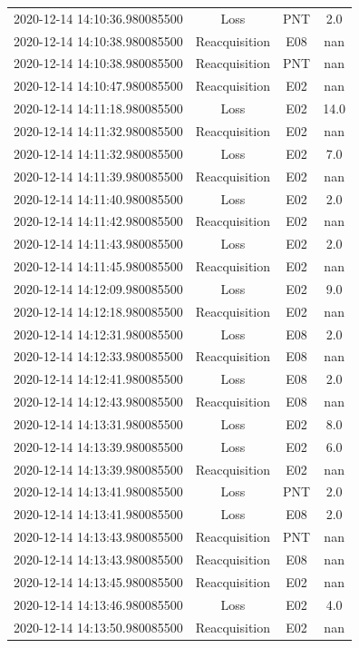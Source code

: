 \begin{enumerate}
\begin{longtabu}{cccc}
2020{-}12{-}14 14:10:36.980085500&Loss&PNT&2.0\\%
2020{-}12{-}14 14:10:38.980085500&Reacquisition&E08&nan\\%
2020{-}12{-}14 14:10:38.980085500&Reacquisition&PNT&nan\\%
2020{-}12{-}14 14:10:47.980085500&Reacquisition&E02&nan\\%
2020{-}12{-}14 14:11:18.980085500&Loss&E02&14.0\\%
2020{-}12{-}14 14:11:32.980085500&Reacquisition&E02&nan\\%
2020{-}12{-}14 14:11:32.980085500&Loss&E02&7.0\\%
2020{-}12{-}14 14:11:39.980085500&Reacquisition&E02&nan\\%
2020{-}12{-}14 14:11:40.980085500&Loss&E02&2.0\\%
2020{-}12{-}14 14:11:42.980085500&Reacquisition&E02&nan\\%
2020{-}12{-}14 14:11:43.980085500&Loss&E02&2.0\\%
2020{-}12{-}14 14:11:45.980085500&Reacquisition&E02&nan\\%
2020{-}12{-}14 14:12:09.980085500&Loss&E02&9.0\\%
2020{-}12{-}14 14:12:18.980085500&Reacquisition&E02&nan\\%
2020{-}12{-}14 14:12:31.980085500&Loss&E08&2.0\\%
2020{-}12{-}14 14:12:33.980085500&Reacquisition&E08&nan\\%
2020{-}12{-}14 14:12:41.980085500&Loss&E08&2.0\\%
2020{-}12{-}14 14:12:43.980085500&Reacquisition&E08&nan\\%
2020{-}12{-}14 14:13:31.980085500&Loss&E02&8.0\\%
2020{-}12{-}14 14:13:39.980085500&Loss&E02&6.0\\%
2020{-}12{-}14 14:13:39.980085500&Reacquisition&E02&nan\\%
2020{-}12{-}14 14:13:41.980085500&Loss&PNT&2.0\\%
2020{-}12{-}14 14:13:41.980085500&Loss&E08&2.0\\%
2020{-}12{-}14 14:13:43.980085500&Reacquisition&PNT&nan\\%
2020{-}12{-}14 14:13:43.980085500&Reacquisition&E08&nan\\%
2020{-}12{-}14 14:13:45.980085500&Reacquisition&E02&nan\\%
2020{-}12{-}14 14:13:46.980085500&Loss&E02&4.0\\%
2020{-}12{-}14 14:13:50.980085500&Reacquisition&E02&nan\\%

\end{longtabu}
\end{enumerate}
